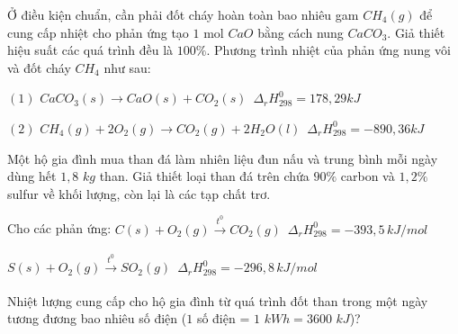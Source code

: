 \documentclass[Main.tex]{subfiles}
\begin{document}
	\begin{bt}[][CD - SGK] Ở điều kiện chuẩn, cần phải đốt cháy hoàn toàn bao nhiêu gam $CH_4(g)$ để cung cấp nhiệt cho phản ứng tạo $1$ mol $CaO$ bằng cách nung $CaCO_3$. Giả thiết hiệu suất các quá trình đều là $100\%$. Phương trình nhiệt của phản ứng nung vôi và đốt cháy $CH_4$ như sau:
		
		$(1)$ $CaCO_3(s) \rightarrow CaO(s) + CO_2(s) \,\,\, \Delta_r H_{298}^0 = 178{,}29kJ$
		
		$(2)$ $CH_4(g) + 2O_2(g) \rightarrow CO_2(g) + 2H_2O(l) \,\,\, \Delta_r H_{298}^0 = -890{,}36kJ$
	\end{bt}
	\begin{bt}Một hộ gia đình mua than đá làm nhiên liệu đun nấu và trung bình mỗi ngày dùng hết $1{,}8$ $kg$ than. Giả thiết loại than đá trên chứa $90\%$ carbon và $1{,}2\%$ sulfur về khối lượng, còn lại là các tạp chất trơ.
		
		Cho các phản ứng: $C(s) + O_2(g) \xrightarrow[]{t^0} CO_2(g) \,\,\, \Delta_r H_{298}^0 = -393{,}5 \, kJ/mol$
		
		$S(s) + O_2(g) \xrightarrow[]{t^0} SO_2(g) \,\,\, \Delta_r H_{298}^0 = -296{,}8 \, kJ/mol$
		
		Nhiệt lượng cung cấp cho hộ gia đình từ quá trình đốt than trong một ngày tương đương bao nhiêu số điện ($1$ số điện = $1$ $kWh = 3600$ $kJ$)?
	\end{bt}
\end{document}
